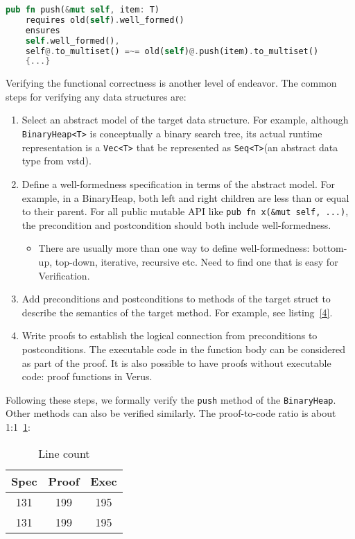 \documentclass[conference]{IEEEtran}
\begin{document}
\begin{lstlisting}[float,language=Rust,style=colouredRust, caption={The specification of the \texttt{push} method of \texttt{BinaryHeap}.}, label = {4}]
    pub fn push(&mut self, item: T)
    requires old(self).well_formed()
    ensures 
    self.well_formed(),
    self@.to_multiset() =~= old(self)@.push(item).to_multiset()
    {...}
\end{lstlisting}
Verifying the functional correctness is another level of endeavor. The common steps for verifying any data structures are:
\begin{enumerate}
        \item Select an abstract model of the target data structure. For example, although \texttt{BinaryHeap<T>} is conceptually a binary search tree, its actual runtime representation is a \texttt{Vec<T>} that be represented as \texttt{Seq<T>}(an abstract data type from vstd).
   \item Define a well-formedness specification in terms of the abstract model. For example, in a BinaryHeap, both left and right children are less than or equal to their parent. For all public mutable API like \texttt{pub fn x(\&mut self, ...)}, the precondition and postcondition should both include well-formedness. 
   \begin{itemize}
        \item There are usually more than one way to define well-formedness: bottom-up, top-down, iterative, recursive etc. Need to find one that is easy for Verification.
   \end{itemize}
   \item Add preconditions and postconditions to methods of the target struct to describe the semantics of the target method. For example, see listing~\ref{4}.  
   \item Write proofs to establish the logical connection from preconditions to postconditions. The executable code in the function body can be considered as part of the proof. It is also possible to have proofs without executable code: proof functions in Verus. 
\end{enumerate}

Following these steps, we formally verify the \texttt{push} method of the \texttt{BinaryHeap}. Other methods can also be verified similarly. The proof-to-code ratio is about 1:1~\ref{Line count}:

\begin{table}[h]
\centering
\begin{tabular}{|c|c|c|}
\hline
\textbf{Spec} & \textbf{Proof} & \textbf{Exec} \\
\hline
131 & 199 & 195 \\
\hline
131 & 199 & 195 \\
\hline
\end{tabular}
\caption{Line count}
\label{Line count}
\end{table}
\end{document}
